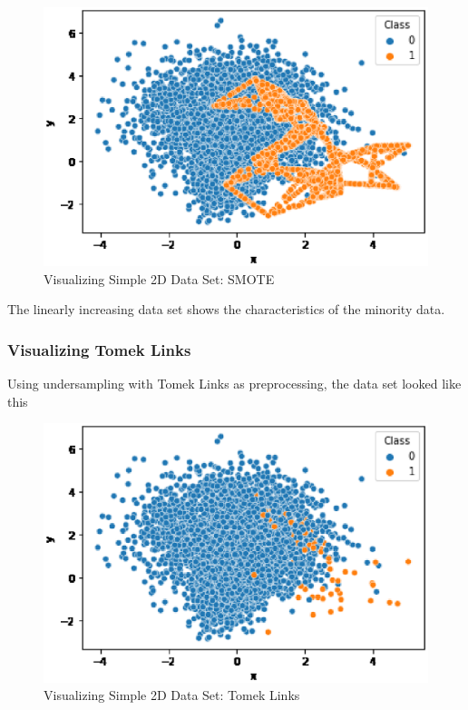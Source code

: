 \begin{center}
    \begin{figure}[ht]
        \caption{Visualizing Simple 2D Data Set: SMOTE}
        \label{tab:team-rating-features}
        \begin{center}
            \includegraphics[scale=0.6]{image/smote.eps}
        \end{center}
    \end{figure}
\end{center}

The linearly increasing data set shows the characteristics of the minority data.

\clearpage
\subsubsection{Visualizing Tomek Links}
Using undersampling with Tomek Links as preprocessing, the data set looked like this

\begin{center}
    \begin{figure}[ht]
        \caption{Visualizing Simple 2D Data Set: Tomek Links}
        \label{tab:team-rating-features}
        \begin{center}
            \includegraphics[scale=0.6]{image/tomek-links.eps}
        \end{center}
    \end{figure}
\end{center}


